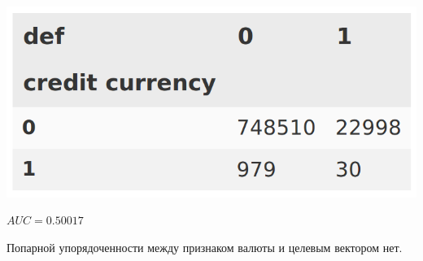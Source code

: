 \documentclass[russian, 10pt]{beamer}
\begin{document}
\begin{frame}

\includegraphics[scale=0.3]{images/currency.png}

\large
$AUC=0.50017$

Попарной упорядоченности между признаком валюты и целевым вектором нет.

\end{frame}
\end{document}
